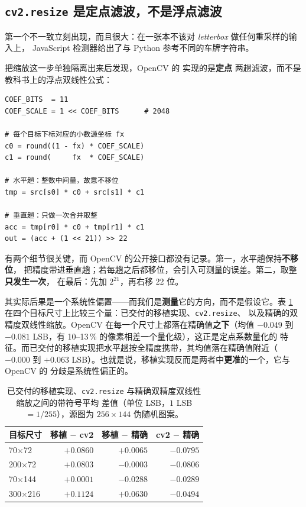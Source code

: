 \documentclass[UTF8,a4paper,11pt]{ctexart}
\begin{document}
\subsection{\texttt{cv2.resize} 是定点滤波，不是浮点滤波}
\label{sec:resize}

第一个不一致立刻出现，而且很大：在一张本不该对 \emph{letterbox} 做任何重采样的输入上，
JavaScript 检测器给出了与 Python 参考不同的车牌字符串。

把缩放这一步单独隔离出来后发现，OpenCV 的  实现的是\textbf{定点}
两趟滤波，而不是教科书上的浮点双线性公式：

\begin{verbatim}
COEF_BITS  = 11
COEF_SCALE = 1 << COEF_BITS      # 2048

# 每个目标下标对应的小数源坐标 fx
c0 = round((1 - fx) * COEF_SCALE)
c1 = round(     fx  * COEF_SCALE)

# 水平趟：整数中间量，故意不移位
tmp = src[s0] * c0 + src[s1] * c1

# 垂直趟：只做一次合并取整
acc = tmp[r0] * c0 + tmp[r1] * c1
out = (acc + (1 << 21)) >> 22
\end{verbatim}

有两个细节很关键，而 OpenCV 的公开接口都没有记录。第一，水平趟保持\textbf{不移位}，
把精度带进垂直趟；若每趟之后都移位，会引入可测量的误差。第二，取整\textbf{只发生一次}，
在最后：先加 $2^{21}$，再右移 22 位。

其实际后果是一个系统性偏置——而我们是\textbf{测量}它的方向，而不是假设它。表
\ref{tab:bias-zh} 在四个目标尺寸上比较三个量：已交付的移植实现、\texttt{cv2.resize}、
以及精确的双精度双线性缩放。OpenCV 在每一个尺寸上都落在精确值\textbf{之下}（均值
$-0.049$ 到 $-0.081$ LSB，有 10--13\,\% 的像素相差一个量化级），这正是定点系数量化的
特征。而已交付的移植实现把水平趟按全精度携带，其均值落在精确值附近（$-0.000$ 到
$+0.063$ LSB）。也就是说，移植实现反而是两者中\textbf{更准}的一个，它与 OpenCV 的
分歧是系统性偏正的。

\begin{table}[htbp]
\centering
\caption{已交付的移植实现、\texttt{cv2.resize} 与精确双精度双线性缩放之间的带符号平均
差值（单位 LSB，$1$ LSB $=1/255$），源图为 $256\times144$ 伪随机图案。}
\label{tab:bias-zh}
\small
\begin{tabular}{@{}lrrr@{}}
\hline
\textbf{目标尺寸} & \textbf{移植 $-$ cv2} & \textbf{移植 $-$ 精确} & \textbf{cv2 $-$ 精确}\\
\hline
70$\times$72   & $+0.0860$ & $+0.0065$ & $-0.0795$\\
200$\times$72  & $+0.0803$ & $-0.0003$ & $-0.0806$\\
70$\times$144  & $+0.0001$ & $-0.0288$ & $-0.0289$\\
300$\times$216 & $+0.1124$ & $+0.0630$ & $-0.0494$\\
\hline
\end{tabular}
\end{table}
\end{document}
